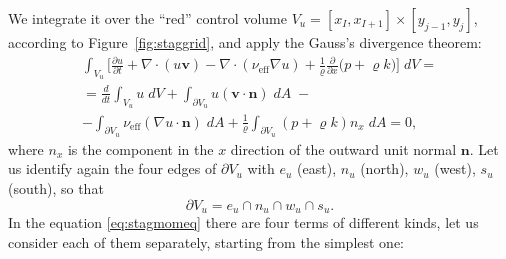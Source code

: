 We integrate it over the ``red'' control volume $V_u=[x_I, 
x_{I+1}]\times[y_{j-1},y_j]$, 
according to Figure~\ref{fig:staggrid}, and apply the Gauss's divergence 
theorem:
\begin{multline} \label{eq:stagmomeq}
\int_{V_u} \bigg[ \frac{\partial u}{\partial t} + \nabla \cdot ( u \mathbf{v} ) 
- \nabla \cdot (\nu_\text{eff} \nabla u) + \frac{1}{\varrho} 
\frac{\partial}{\partial x} \big( p + \varrho k \big) \bigg ]\; dV 
=\\
=\frac{d}{dt} \int_{V_u} u\; dV + \int_{\partial V_u} u (\mathbf{v} \cdot 
\mathbf{n}) \; dA \;-\\
- \int_{\partial V_u} \nu_\text{eff} (\nabla u \cdot \mathbf{n}) \; dA + 
\frac{1}{\varrho}\int_{\partial V_u} (p + \varrho k) n_x \; 
dA = 0,
\end{multline}
where $n_x$ is the component in the $x$ direction of the outward unit 
normal $\mathbf{n}$. Let us identify again the four edges of $\partial V_u$ 
with $e_u$ (east), $n_u$ (north), $w_u$ (west), $s_u$ (south), so that
\begin{equation}
	\partial V_u = e_u \cap n_u \cap w_u \cap s_u.
\end{equation}
In the equation \eqref{eq:stagmomeq} there are four terms of different kinds, 
let us consider each of them separately, starting from the simplest one:
